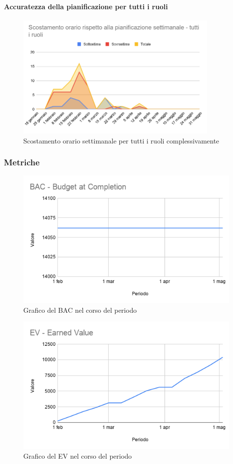 \paragraph{Accuratezza della pianificazione per tutti i ruoli}
\begin{figure}[H]
	\centering
	\includegraphics[width=10cm]{res/images/tutti}
	\caption{Scostamento orario settimanale per tutti i ruoli complessivamente}
	\label{fig:Scostamento orario settimanale per tutti i ruoli complessivamente}
\end{figure}

\subsubsection{Metriche}
	\begin{figure}[H]
	\centering
	\includegraphics[width=0.7\linewidth]{res/images/BAC.png}
	\caption{Grafico del BAC nel corso del periodo}
	\label{fig:Figura1}
\end{figure}

\begin{figure}[H]
	\centering
	\includegraphics[width=0.7\linewidth]{res/images/EV.png}
	\caption{Grafico del EV nel corso del periodo}
	\label{fig:Figura2}
\end{figure}

